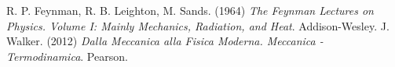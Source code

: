 \begin{thebibliography}{9}
R. P. Feynman, R. B. Leighton, M. Sands. (1964) \textit{The Feynman Lectures on Physics. Volume I: Mainly Mechanics, Radiation, and Heat}. Addison-Wesley.
J. Walker. (2012) \textit{Dalla Meccanica alla Fisica Moderna. Meccanica - Termodinamica}. Pearson.
\end{thebibliography}